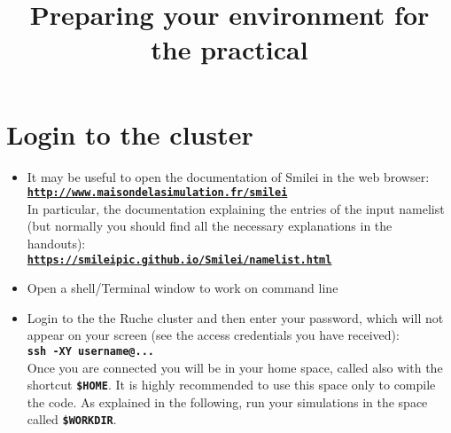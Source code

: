 \documentclass{article}
\title{\vspace{-2.cm}Preparing  your environment for the practical}
\newcommand{\smilei}{{\sc Smilei}\xspace}
\newcommand{\commandline}[1]{\texttt{\textbf{#1}}}
\begin{document}
\maketitle

\tableofcontents



\section{Login to the cluster}
\begin{itemize}

\item It may be useful to open the documentation of \smilei in the web browser:\\
 	\commandline{\url{http://www.maisondelasimulation.fr/smilei}}	\\
	In particular, the documentation explaining the entries of the input namelist (but normally you should find all the necessary explanations in the handouts):\\
\commandline{\url{https://smileipic.github.io/Smilei/namelist.html}}

\item Open a shell/Terminal window to work on command line

\item Login to the the Ruche cluster and then enter your password, which will not appear on your screen (see the access credentials you have received):\\
\commandline{ssh -XY username@...}\\

Once you are connected you will be in your home space, called also with the shortcut \commandline{\$HOME}.
It is highly recommended to use this space only to compile the code. As explained in the following, run your simulations in the space called \commandline{\$WORKDIR}. 
\end{itemize}
\end{document}
